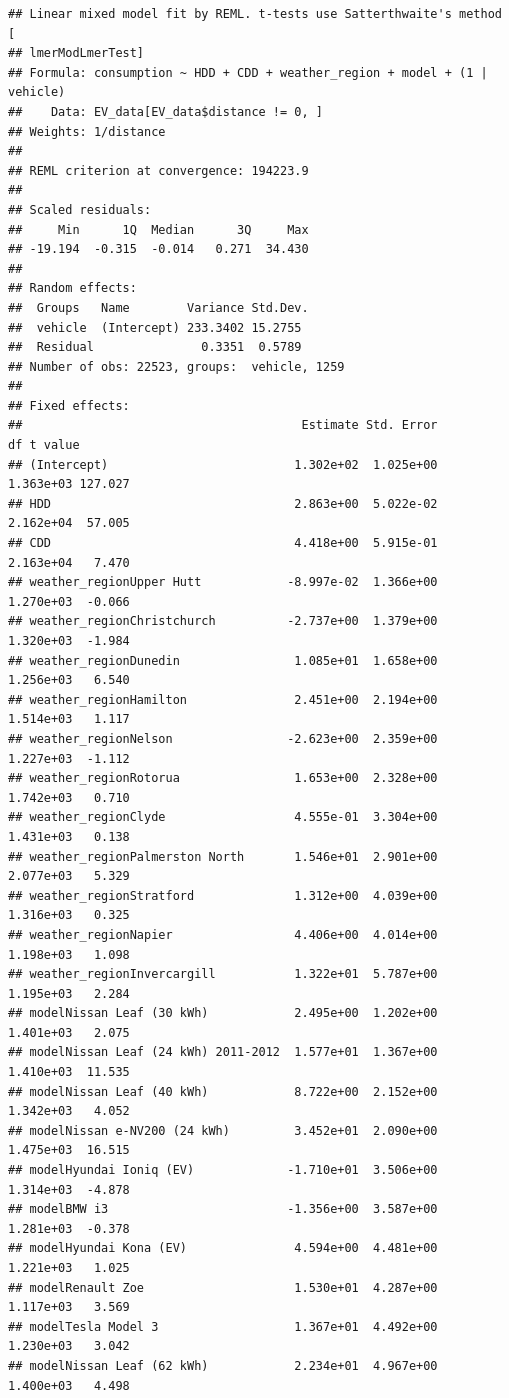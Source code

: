 \documentclass[
]{article}
\begin{document}
\begin{verbatim}
## Linear mixed model fit by REML. t-tests use Satterthwaite's method [
## lmerModLmerTest]
## Formula: consumption ~ HDD + CDD + weather_region + model + (1 | vehicle)
##    Data: EV_data[EV_data$distance != 0, ]
## Weights: 1/distance
## 
## REML criterion at convergence: 194223.9
## 
## Scaled residuals: 
##     Min      1Q  Median      3Q     Max 
## -19.194  -0.315  -0.014   0.271  34.430 
## 
## Random effects:
##  Groups   Name        Variance Std.Dev.
##  vehicle  (Intercept) 233.3402 15.2755 
##  Residual               0.3351  0.5789 
## Number of obs: 22523, groups:  vehicle, 1259
## 
## Fixed effects:
##                                       Estimate Std. Error         df t value
## (Intercept)                          1.302e+02  1.025e+00  1.363e+03 127.027
## HDD                                  2.863e+00  5.022e-02  2.162e+04  57.005
## CDD                                  4.418e+00  5.915e-01  2.163e+04   7.470
## weather_regionUpper Hutt            -8.997e-02  1.366e+00  1.270e+03  -0.066
## weather_regionChristchurch          -2.737e+00  1.379e+00  1.320e+03  -1.984
## weather_regionDunedin                1.085e+01  1.658e+00  1.256e+03   6.540
## weather_regionHamilton               2.451e+00  2.194e+00  1.514e+03   1.117
## weather_regionNelson                -2.623e+00  2.359e+00  1.227e+03  -1.112
## weather_regionRotorua                1.653e+00  2.328e+00  1.742e+03   0.710
## weather_regionClyde                  4.555e-01  3.304e+00  1.431e+03   0.138
## weather_regionPalmerston North       1.546e+01  2.901e+00  2.077e+03   5.329
## weather_regionStratford              1.312e+00  4.039e+00  1.316e+03   0.325
## weather_regionNapier                 4.406e+00  4.014e+00  1.198e+03   1.098
## weather_regionInvercargill           1.322e+01  5.787e+00  1.195e+03   2.284
## modelNissan Leaf (30 kWh)            2.495e+00  1.202e+00  1.401e+03   2.075
## modelNissan Leaf (24 kWh) 2011-2012  1.577e+01  1.367e+00  1.410e+03  11.535
## modelNissan Leaf (40 kWh)            8.722e+00  2.152e+00  1.342e+03   4.052
## modelNissan e-NV200 (24 kWh)         3.452e+01  2.090e+00  1.475e+03  16.515
## modelHyundai Ioniq (EV)             -1.710e+01  3.506e+00  1.314e+03  -4.878
## modelBMW i3                         -1.356e+00  3.587e+00  1.281e+03  -0.378
## modelHyundai Kona (EV)               4.594e+00  4.481e+00  1.221e+03   1.025
## modelRenault Zoe                     1.530e+01  4.287e+00  1.117e+03   3.569
## modelTesla Model 3                   1.367e+01  4.492e+00  1.230e+03   3.042
## modelNissan Leaf (62 kWh)            2.234e+01  4.967e+00  1.400e+03   4.498

\end{verbatim}
\end{document}
